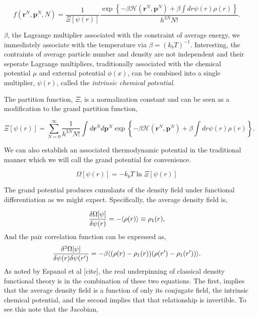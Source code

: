 \begin{equation}
    f(\mathbf{r}^N, \mathbf{p}^N, N) = \frac{1}{\Xi[\psi(r)]}\frac{\exp\left\lbrace -\beta \mathcal{H}(\mathbf{r}^N, \mathbf{p}^N) + \beta \int dr \psi(r) \rho(r)\right\rbrace}{h^{3N} N! }.
\end{equation}

$\beta$, the Lagrange multiplier associated with the constraint of average energy, we immediately associate with the temperature via $\beta = (k_b T)^{-1}$. Interesting, the contraints of average particle number and density are not independent and their seperate Lagrange multipliers, traditionally associated with the chemical potential $\mu$ and external potential $\phi(x)$, can be combined into a single multiplier, $\psi(r)$, called the \textit{intrinsic chemical potential}. 

The partition function, $\Xi$, is a normalization constant and can be seen as a modification to the grand partition function, 

\begin{equation}
    \Xi[\psi(r)] = \sum_{N=0}^\infty \frac{1}{h^{3N}N!}\int d\mathbf{r}^N d\mathbf{p}^N \exp\left\lbrace -\beta \mathcal{H}(\mathbf{r}^N, \mathbf{p}^N) + \beta \int dr \psi(r) \rho(r)\right\rbrace.
\end{equation}

We can also establish an associated thermodynamic potential in the traditional manner which we will call the grand potential for convenience. 

\begin{equation}
    \Omega[\psi(r)] = -k_b T \ln \Xi[\psi(r)]
\end{equation}

The grand potential produces cumulants of the density field under functional differentiation as we might expect. Specifically, the average density field is, 

\begin{equation}
    \frac{\delta \Omega[\psi]}{\delta \psi(r)} = -\langle \rho(r) \rangle \equiv \rho_1(r),
\end{equation}
And the pair correlation function can be expressed as, 
\begin{equation}
    \frac{\delta^2 \Omega[\psi]}{\delta \psi(r) \delta \psi(r^\prime)} = - \beta \langle (\rho(r) - \rho_1(r))(\rho(r^\prime) - \rho_1(r^\prime)) \rangle.
\end{equation}
As noted by Espanol et al [cite], the real underpinning of classical density functional theory is in the combination of these two equations. The first, implies that the average density field is a function of only its conjugate field, the intrinsic chemical potential, and the second implies that that relationship is invertible. To see this note that the Jacobian, 

